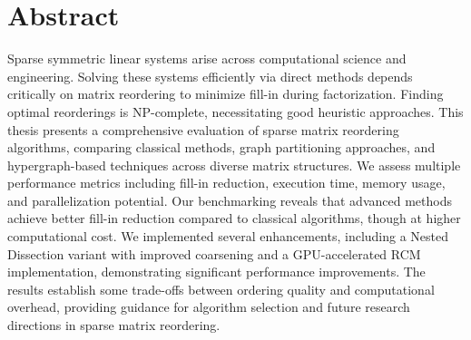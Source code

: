 \chapter*{Abstract}

Sparse symmetric linear systems arise across computational science and engineering. Solving these systems efficiently via direct methods depends critically on matrix reordering to minimize fill-in during factorization. Finding optimal reorderings is NP-complete, necessitating good heuristic approaches. This thesis presents a comprehensive evaluation of sparse matrix reordering algorithms, comparing classical methods, graph partitioning approaches, and hypergraph-based techniques across diverse matrix structures. We assess multiple performance metrics including fill-in reduction, execution time, memory usage, and parallelization potential. Our benchmarking reveals that advanced methods achieve better fill-in reduction compared to classical algorithms, though at higher computational cost. We implemented several enhancements, including a Nested Dissection variant with improved coarsening and a GPU-accelerated RCM implementation, demonstrating significant performance improvements. The results establish some trade-offs between ordering quality and computational overhead, providing guidance for algorithm selection and future research directions in sparse matrix reordering.